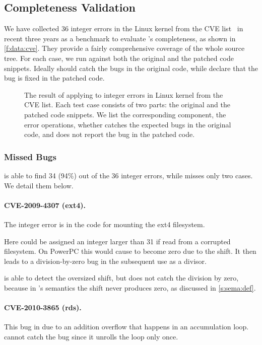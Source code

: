 \subsection{Completeness Validation}

We have collected 36 integer errors in the Linux kernel from the
CVE list~\cite{cve} in recent three years as a benchmark to evaluate
\sys's completeness, as shown in \autoref{f:data:cve}.  They provide
a fairly comprehensive coverage of the whole source tree.  For each
case, we run \sys against both the original and the patched code
snippets.  Ideally \sys should catch the bugs in the original code,
while declare that the bug is fixed in the patched code.

\begin{figure*}
\centering
\footnotesize

\caption{The result of applying \sys to integer errors in Linux
kernel from the CVE list.  Each test case consists of two parts:
the original and the patched code snippets.  We list the corresponding
component, the error operations, whether \sys catches the expected
bugs in the original code, and does not report the bug in the patched
code.}
\label{f:data:cve}
\end{figure*}

\subsubsection{Missed Bugs}

\sys is able to find 34 (94\%) out of the 36 integer errors, while
misses only two cases.  We detail them below.

\paragraph{CVE-2009-4307 (ext4).}
The integer error is in the code for mounting the ext4 filesystem.

Here  could be assigned an integer
larger than 31 if read from a corrupted filesystem.  On PowerPC
this would cause  to become zero due to the
shift.  It then leads to a division-by-zero bug in the subsequent
use as a divisor.

\sys is able to detect the oversized shift, but does not catch the
division by zero, because in \sys's semantics the shift never
produces zero, as discussed in \autoref{s:sema:def}.

\paragraph{CVE-2010-3865 (rds).}
This bug in due to an addition overflow that happens in an accumulation
loop.  \sys cannot catch the bug since it unrolls the loop only
once.

